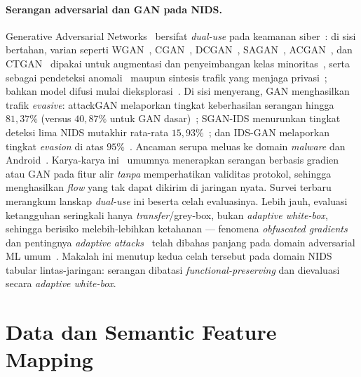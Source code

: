 \documentclass[11pt,a4paper]{article}
\begin{document}
\paragraph{Serangan adversarial dan GAN pada NIDS.} Generative Adversarial
Networks~\cite{gan} bersifat \emph{dual-use} pada keamanan siber~\cite{alauthman}:
di sisi bertahan, varian seperti WGAN~\cite{wgan}, CGAN~\cite{cgan},
DCGAN~\cite{dcgan}, SAGAN~\cite{sagan}, ACGAN~\cite{acgan}, dan
CTGAN~\cite{ctgan} dipakai untuk augmentasi dan penyeimbangan kelas
minoritas~\cite{kumar,zhaogan,tmggan,cegan,ctganids,park,ewgan}, serta sebagai
pendeteksi anomali~\cite{tcn} maupun sintesis trafik yang menjaga
privasi~\cite{aceto}; bahkan model difusi mulai dieksplorasi~\cite{diffids}. Di sisi menyerang, GAN menghasilkan trafik
\emph{evasive}: attackGAN melaporkan tingkat keberhasilan serangan hingga
$81{,}37\%$ (versus $40{,}87\%$
untuk GAN dasar)~\cite{attackgan}; SGAN-IDS menurunkan tingkat deteksi lima NIDS
mutakhir rata-rata $15{,}93\%$~\cite{sganids}; dan IDS-GAN melaporkan tingkat
\emph{evasion} di atas $95\%$~\cite{idsgan}. Ancaman serupa meluas ke domain
\emph{malware} dan Android~\cite{aagan,gleam,dunmore}. Karya-karya
ini~\cite{randhawa,mbow,demgan}
umumnya menerapkan serangan berbasis gradien atau GAN pada fitur alir \emph{tanpa}
memperhatikan validitas protokol, sehingga menghasilkan \emph{flow} yang tak
dapat dikirim di jaringan nyata. Survei terbaru~\cite{alauthman,alajlan} merangkum
lanskap \emph{dual-use} ini beserta celah evaluasinya. Lebih jauh, evaluasi ketangguhan seringkali
hanya \emph{transfer}/grey-box, bukan \emph{adaptive white-box}, sehingga
berisiko melebih-lebihkan ketahanan --- fenomena \emph{obfuscated
gradients}~\cite{obfuscated} dan pentingnya \emph{adaptive attacks}~\cite{adaptive}
telah dibahas panjang pada domain adversarial ML umum~\cite{szegedy,fgsm,madry}.
Makalah ini menutup kedua celah tersebut pada domain NIDS tabular
lintas-jaringan: serangan dibatasi \emph{functional-preserving} dan dievaluasi
secara \emph{adaptive white-box}.
\fi

\section{Data dan Semantic Feature Mapping}
\label{sec:sfm}
\end{document}
